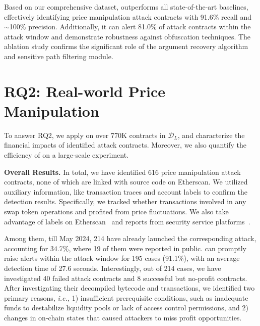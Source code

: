 \begin{tcolorbox}[title= Answer to RQ1, left=2pt, right=2pt, top=0.5pt,bottom=0.5pt, colback=gray!5,colframe=gray!80!black]
Based on our comprehensive dataset, {\tool} outperforms all state-of-the-art baselines, effectively identifying price manipulation attack contracts with 91.6\% recall and $\sim$100\% precision. Additionally, it can alert 81.0\% of attack contracts within the attack window and demonstrate robustness against obfuscation techniques. The ablation study confirms the significant role of the argument recovery algorithm and sensitive path filtering module.
\end{tcolorbox}



\section{RQ2: Real-world Price Manipulation}

To answer RQ2, we apply {\tool} on over 770K contracts in $\mathcal{D}_L$, and characterize the financial impacts of identified attack contracts. Moreover, we also quantify the efficiency of {\tool} on a large-scale experiment.
   

\noindent
\textbf{Overall Results.}
In total, we have identified 616 price manipulation attack contracts, none of which are linked with source code on Etherscan.
We utilized auxiliary information, like transaction traces and account labels to confirm the detection results. Specifically, we tracked whether transactions involved in any swap token operations and profited from price fluctuations. We also take advantage of labels on Etherscan~\cite{EthApi} and reports from security service platforms~\cite{Defihacklab, slowmist, rekt}. 

Among them, till May 2024, 214 have already launched the corresponding attack, accounting for 34.7\%, where 19 of them were reported in public. {\tool} can promptly raise alerts within the attack window for 195 cases (91.1\%), with an average detection time of 27.6 seconds.
Interestingly, out of 214 cases, we have investigated 40
failed attack contracts and 8 successful but no-profit contracts. After investigating their decompiled bytecode and transactions, we identified two primary reasons, \textit{i.e.,} 1) insufficient prerequisite conditions, such as inadequate funds to destabilize liquidity pools or lack of access control permissions, and 2) changes in on-chain states that caused attackers to miss profit opportunities.



